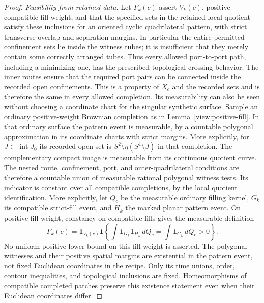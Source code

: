 \begin{proof}
\smallskip\noindent\emph{Feasibility from retained data.}
Let $F_k(c)$ assert $V_k(c)$, positive compatible fill weight, and that
the specified sets in the
retained local quotient satisfy these inclusions for an oriented cyclic
quadrilateral pattern, with strict transverse-overlap and separation
margins.  In particular the entire permitted confinement sets lie
inside the witness tubes; it is insufficient that they merely contain
some correctly arranged tubes.  Thus every allowed port-to-port path,
including a minimizing one, has the prescribed topological crossing
behavior.  The inner routes ensure that the required port pairs can
be connected inside the recorded open confinements.  This is a property of
$X_c$ and the recorded sets and is therefore the same in every allowed
completion.  Its measurability can also be seen without choosing a
coordinate chart for the singular synthetic surface.  Sample an
ordinary positive-weight Brownian completion as in
Lemma~\ref{view:positive-fill}.  In that ordinary surface the pattern
event is measurable, by a countable polygonal approximation in its
coordinate charts with strict margins.  More explicitly, for
$J\subset\operatorname{int}J_0$ its recorded open set is
$S^2\setminus\eta(S^1\setminus J)$ in that completion.  The complementary
compact image is measurable from its continuous quotient curve.  The
nested route, confinement, port, and outer-quadrilateral conditions are
therefore a countable union of measurable rational polygonal witness
tests.  Its indicator is constant over
all compatible completions, by the local quotient identification.
More explicitly, let $Q_c$ be the measurable ordinary filling kernel,
$G_k$ its compatible strict-fill event, and $H_k$ the marked planar
pattern event.  On positive fill weight, constancy on compatible fills
gives the measurable definition
\[
 F_k(c)=\mathbf 1_{V_k(c)}\mathbf 1\left\{
 \int\mathbf1_{G_k}\mathbf1_{H_k}\,dQ_c
 =\int\mathbf1_{G_k}\,dQ_c>0\right\}.
\]
No uniform positive lower bound on this fill weight is asserted.
The polygonal witnesses and their positive spatial margins are
existential in the pattern event, not fixed Euclidean coordinates in
the recipe.  Only its time unions, order, contour inequalities, and
topological inclusions are fixed.  Homeomorphisms of compatible
completed patches preserve this existence statement even when their
Euclidean coordinates differ.


\end{proof}
